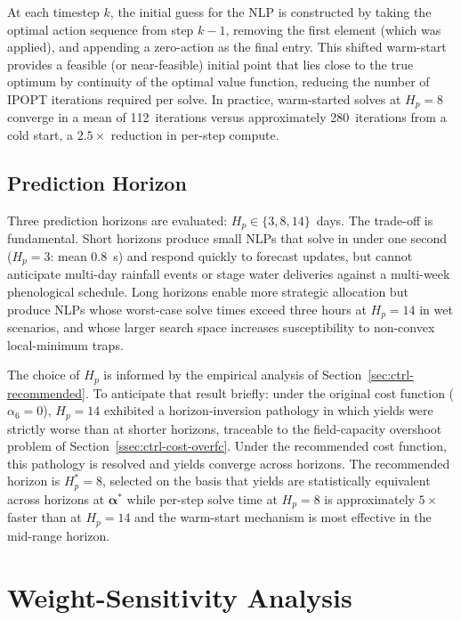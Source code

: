 At each timestep $k$, the initial guess for the NLP is constructed by
taking the optimal action sequence from step $k-1$, removing the first
element (which was applied), and appending a zero-action as the final entry.
This shifted warm-start provides a feasible (or near-feasible) initial
point that lies close to the true optimum by continuity of the optimal
value function, reducing the number of IPOPT iterations required per solve.
In practice, warm-started solves at $H_p = 8$ converge in a mean of
112~iterations versus approximately 280~iterations from a cold start, a
$2.5\times$ reduction in per-step compute.

\subsection{Prediction Horizon}
\label{ssec:ctrl-horizon}

Three prediction horizons are evaluated: $H_p \in \{3, 8, 14\}$~days. The
trade-off is fundamental. Short horizons produce small NLPs that solve in
under one second ($H_p = 3$: mean 0.8~s) and respond quickly to forecast
updates, but cannot anticipate multi-day rainfall events or stage water
deliveries against a multi-week phenological schedule. Long horizons enable
more strategic allocation but produce NLPs whose worst-case solve times
exceed three hours at $H_p = 14$ in wet scenarios, and whose larger search
space increases susceptibility to non-convex local-minimum traps.

The choice of $H_p$ is informed by the empirical analysis of
Section~\ref{sec:ctrl-recommended}. To anticipate that result briefly: under
the original cost function ($\alpha_6 = 0$), $H_p = 14$ exhibited a
horizon-inversion pathology in which yields were strictly worse than at
shorter horizons, traceable to the field-capacity overshoot problem of
Section~\ref{ssec:ctrl-cost-overfc}. Under the recommended cost function,
this pathology is resolved and yields converge across horizons. The
recommended horizon is $H_p^* = 8$, selected on the basis that yields are
statistically equivalent across horizons at $\boldsymbol{\alpha}^*$ while
per-step solve time at $H_p = 8$ is approximately $5\times$ faster than at
$H_p = 14$ and the warm-start mechanism is most effective in the mid-range
horizon.

\section{Weight-Sensitivity Analysis}
\label{sec:ctrl-sweep}

